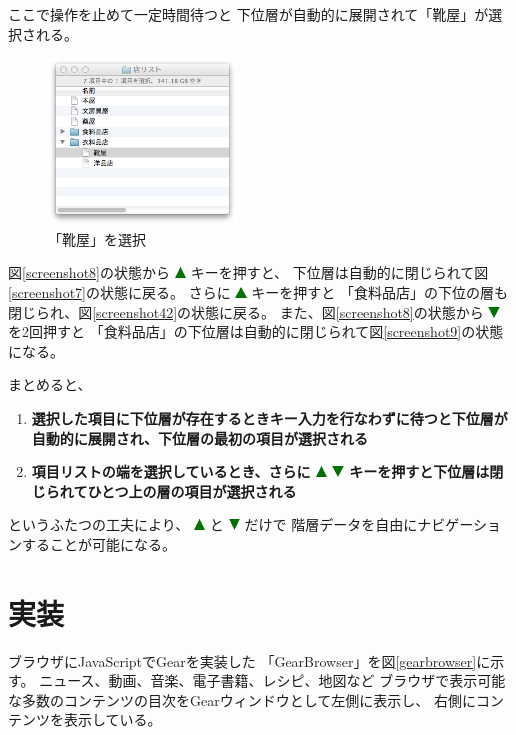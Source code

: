 \documentclass[twoside]{wiss}
\def\GEAR{\textsf{Gear}}
\def\GB{\textsf{GearBrowser}}
\def\figwidth{50mm}
\def\uptriangle{ \includegraphics[width=3mm,bb=0 0 36 36]{figures/uptriangle.pdf} }
\def\downtriangle{ \includegraphics[width=3mm,bb=0 0 36 36]{figures/downtriangle.pdf} }
\begin{document}
\noindent
ここで操作を止めて一定時間待つと
下位層が自動的に展開されて「靴屋」が選択される。

\begin{figure}[H]
\centerline{\includegraphics[width=\figwidth,bb=0 0 344 304]{figures/fddd5777d39924ea3f0220ae39a604c1.png}}
\caption{「靴屋」を選択}
\label{screenshot10}
\end{figure}

図\ref{screenshot8}の状態から{\uptriangle}キーを押すと、
下位層は自動的に閉じられて図\ref{screenshot7}の状態に戻る。 
さらに{\uptriangle}キーを押すと
「食料品店」の下位の層も閉じられ、図\ref{screenshot42}の状態に戻る。
%
また、図\ref{screenshot8}の状態から{\downtriangle}を2回押すと
「食料品店」の下位層は自動的に閉じられて図\ref{screenshot9}の状態になる。

まとめると、

\begin{enumerate}
\item \textbf{選択した項目に下位層が存在するときキー入力を行なわずに待つと下位層が自動的に展開され、下位層の最初の項目が選択される}
\item \textbf{項目リストの端を選択しているとき、さらに{\uptriangle}{\downtriangle}キーを押すと下位層は閉じられてひとつ上の層の項目が選択される}
\end{enumerate}

\noindent
というふたつの工夫により、
{\uptriangle}と{\downtriangle}だけで
階層データを自由にナビゲーションすることが可能になる。

\section{実装}

ブラウザにJavaScriptで{\GEAR}を実装した
「{\GB}」を図\ref{gearbrowser}に示す。
ニュース、動画、音楽、電子書籍、レシピ、地図など
ブラウザで表示可能な多数のコンテンツの目次を{\GEAR}ウィンドウとして左側に表示し、
右側にコンテンツを表示している。
\end{document}
